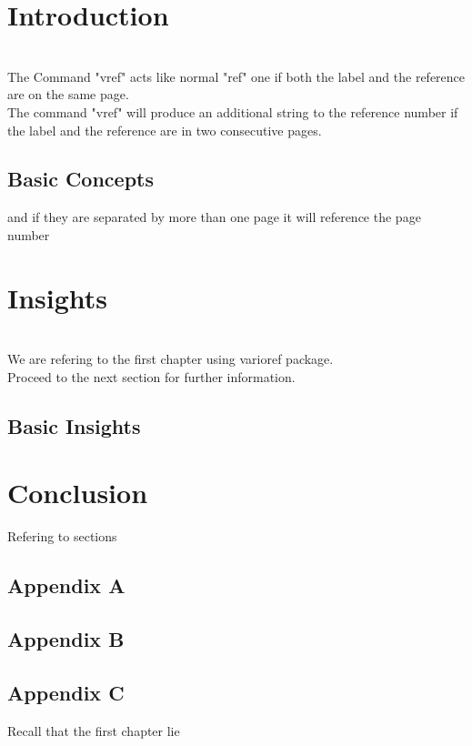 \documentclass{book}
\begin{document}
	\chapter{Introduction}
	\label{chap:intro}
	\lipsum[1]	\\
	
	The Command "vref" acts like normal "ref" one 
	if both the label and the reference 
	{} are
	on the same page. \\
	
	The command "vref" will produce an additional
	string to the reference number
	{} 
	if the label and the reference are in two
	consecutive pages.
	
	\pagebreak
	
	\section{Basic Concepts}
	\label{sec:basicnpt}
	\lipsum[1-4]
	
	\pagebreak
	
	and if they are separated by more than one page
	it will reference the page number
	{}
	
	\chapter{Insights}
	\lipsum[1]	\\
	We are refering to the first chapter 
	 using varioref package. \\
	Proceed to the next section
	 for further information.
	
	\pagebreak
	
	\section{Basic Insights}
	\label{sec:basicins}
	\lipsum[1-2]
	
	\chapter{Conclusion}
	Refering to sections 
	\section{Appendix A}
	\label{app:a}
	
	\section{Appendix B}
	\label{app:b}
	
	\section{Appendix C}
	\label{app:c}
	
	Recall that the first chapter lie
\end{document}
